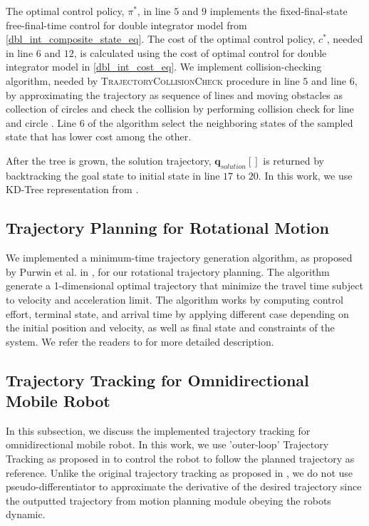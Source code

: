 \documentclass[conference]{IEEEtran}
\begin{document}
The optimal control policy, $\pi^{*}$, in line $5$ and $9$ implements the fixed-final-state free-final-time control for double integrator model from \eqref{dbl_int_composite_state_eq}. The cost of the optimal control policy, $c^{*}$, needed in line $6$ and $12$, is calculated using the cost of optimal control for double integrator model in \eqref{dbl_int_cost_eq}. We implement collision-checking algorithm, needed by \textsc{TrajectoryCollisionCheck} procedure in line $5$ and line $6$, by approximating the trajectory as sequence of lines and moving obstacles as collection of circles and check the collision by performing collision check for line and circle \cite{bourke2016points}. Line $6$ of the algorithm select the neighboring states of the sampled state that has lower cost among the other.

After the tree is grown, the solution trajectory, $\boldsymbol{q}_{solution}[]$ is returned by backtracking the goal state to initial state in line $17$ to $20$. In this work, we use KD-Tree representation from \cite{blanco2014nanoflann}.

\subsection{Trajectory Planning for Rotational Motion}

We implemented a minimum-time trajectory generation algorithm, as proposed by Purwin et al. in \cite{purwin2006trajectory}, for our rotational trajectory planning. The algorithm generate a 1-dimensional optimal trajectory that minimize the travel time subject to velocity and acceleration limit. The algorithm works by computing control effort, terminal state, and arrival time by applying different case depending on the initial position and velocity, as well as final state and constraints of the system. We refer the readers to \cite{purwin2006trajectory} for more detailed description.

\subsection{Trajectory Tracking for Omnidirectional Mobile Robot}
In this subsection, we discuss the implemented trajectory tracking for omnidirectional mobile robot. In this work, we use 'outer-loop' Trajectory Tracking as proposed in \cite{liu2008omni} to control the robot to follow the planned trajectory as reference. Unlike the original trajectory tracking as proposed in \cite{liu2008omni}, we do not use pseudo-differentiator to approximate the derivative of the desired trajectory since the outputted trajectory from motion planning module obeying the robots dynamic.
\end{document}
